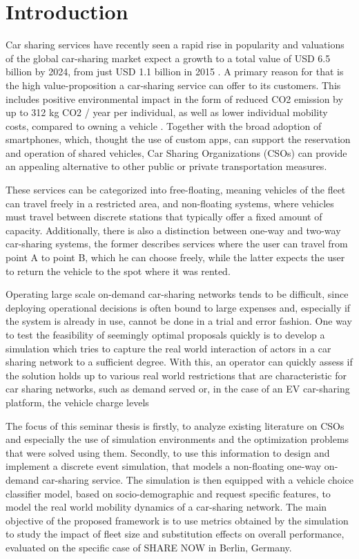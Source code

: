 \clearpage
\section{Introduction}
\label{sec:Intro}

Car sharing services have recently seen a rapid rise in popularity 
and valuations of the global car-sharing market expect a growth to
a total value of USD 6.5 billion by 2024, from just USD 1.1 billion in 2015 . 
A primary reason for that is the high value-proposition a car-sharing service
can offer to its customers. This includes positive environmental impact in the form of
reduced CO2 emission by up to 312 kg CO2 / year per individual, as well as
lower individual mobility costs, compared to owning a vehicle . 
Together with the
broad adoption of smartphones, which, thought the use of custom apps, can
support the reservation and operation of shared vehicles, Car Sharing Organizations (CSOs)
can provide an appealing alternative to other public or private transportation measures.

These services can be categorized into free-floating, meaning vehicles of the fleet
can travel freely in a restricted area, and non-floating systems, where vehicles must travel
between discrete stations that typically offer a fixed amount of capacity. Additionally,
there is also a distinction between one-way and two-way car-sharing systems, the former
describes services where the user can travel from point A to point B, which he can choose
freely, while the latter expects the user to return the vehicle to the spot where it was
rented.

Operating large scale on-demand car-sharing networks tends to be difficult, since
deploying operational decisions is often bound to large expenses and, especially if the
system is already in use, cannot be done in a trial and error fashion. One way to test the feasibility of
seemingly optimal proposals quickly is to develop a simulation which tries to capture the real world
interaction of actors in a car sharing network to a sufficient degree. With this, an operator can 
quickly assess if the solution holds up to various real world restrictions that are characteristic
for car sharing networks, such as demand served or, in the case of an EV car-sharing platform, the vehicle
charge levels 

The focus of this seminar thesis is firstly, to analyze existing literature on CSOs and especially
the use of simulation environments and the optimization problems that were solved using them.
Secondly, to use this information to design
and implement a discrete event simulation, that models a non-floating one-way on-demand
car-sharing service. The simulation is then equipped with a vehicle choice
classifier model, based on socio-demographic and request specific features,
to model the real world mobility dynamics of a car-sharing network.
The main objective of the proposed framework is to use metrics obtained by the simulation
to study the impact of fleet size and substitution effects on overall performance,
evaluated on the specific case of SHARE NOW in Berlin, Germany.
